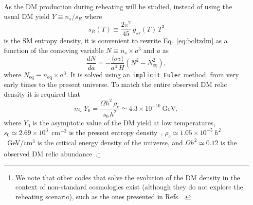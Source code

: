 \documentclass[a4paper,11pt]{article}
\newcommand{\mdm}{m_s}
\newcommand{\gss}{g_{\star s}}
\newcommand{\sv}{\langle\sigma v\rangle}
\begin{document}
As the DM production during reheating will be studied, instead of using the usual DM yield $Y \equiv n_s/s_R$ where
\begin{equation}
    s_R(T) \equiv \frac{2 \pi^2}{45}\, \gss(T)\, T^3
\end{equation}
is the SM entropy density, it is convenient to rewrite Eq.~\eqref{eq:boltzdm} as a function of the comoving variable $N \equiv n_s \times a^3$ and $a$ as
\begin{equation}
    \frac{dN}{da} = - \frac{\sv}{a^4\, H} \left(N^2 - N_\text{eq}^2\right),
\end{equation}
where $N_\text{eq} \equiv n_\text{eq} \times a^3$.
It is solved using an \texttt{implicit Euler} method, from very early times to the present universe.
To match the entire observed DM relic density it is required that
\begin{equation}
    \mdm\, Y_0 = \frac{\Omega h^2\, \rho_c}{s_0\, h^2} \simeq 4.3 \times 10^{-10}~\text{GeV},
\end{equation}
where $Y_0$ is the asymptotic value of the DM yield at low temperatures, $s_0 \simeq 2.69 \times 10^3$~cm$^{-3}$ is the present entropy density~\cite{ParticleDataGroup:2020ssz}, $\rho_c \simeq 1.05 \times 10^{-5}~h^2$~GeV/cm$^3$ is the critical energy density of the universe, and $\Omega h^2 \simeq 0.12$ is the observed DM relic abundance~\cite{Planck:2018vyg}.\footnote{We note that other codes that solve the evolution of the DM density in the context of non-standard cosmologies exist (although they do not explore the reheating scenario), such as the ones presented in Refs.~\cite{Dutra:2021phm, Cheek:2022dbx, Cheek:2022mmy, Karamitros:2023uak}.}
\end{document}
